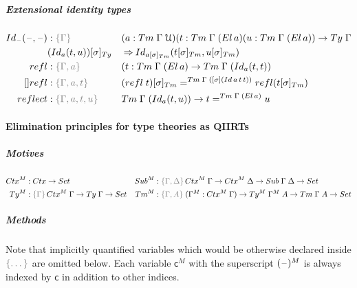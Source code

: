 \documentclass[a4paper,UKenglish,numberwithinsect,cleveref,thm-restate]{lipics-v2021}
\begin{document}
\subparagraph*{Extensional identity types}

\begin{alignat*}{5}
  \idtype[\blank]{\blank}{\blank} & : \implicit{\Gamma} && (a : \Tm\;\Gamma\;\UU) (t : \Tm\;\Gamma\;(\El\,a)(u : \Tm\;\Gamma\;(\El\,a)) \to \Ty\;\Gamma \\
  & \subTy{(\idtype[a]{t}{u})}{\sigma} && \reduce \idtype[{\subTm{a}{\sigma}}]{\subTm{t}{\sigma}}{\subTm{u}{\sigma}} \\
  \mathsf{refl} & : \implicit{\Gamma, a}\;&&(t : \Tm\;\Gamma\;(\El\,a) \to \Tm\;\Gamma\;(\idtype[a]{t}{t}) \\
  []\mathsf{refl} & : \implicit{\Gamma, a, t}\;&& \subTm{(\mathsf{refl}\;t)}{\sigma} =^{\Tm\;\Gamma\;([\sigma](\mathsf{Id}\,a\,t\,t))} \mathsf{refl}(\subTm{t}{\sigma}) \\
  \mathsf{reflect} & : \implicit{\Gamma, a, t, u}\;&& \Tm\;\Gamma\;(\idtype[a]{t}{u}) \to t =^{\Tm\;\Gamma\;(\El\,a)} u
\end{alignat*}

\paragraph*{Elimination principles for type theories as QIIRTs}

\subparagraph*{Motives}
\begin{align*}
  \Ctx^M & : \Ctx \to \Set &
  \Sub^M & : \implicit{\Gamma, \Delta}\,\Ctx^M\;\Gamma \to \Ctx^M\;\Delta \to \Sub\;\Gamma\;\Delta \to \Set \\
  \Ty^M  & : \implicit{\Gamma}\,\Ctx^M\;\Gamma \to \Ty\;\Gamma \to \Set &
  \Tm^M  & : \implicit{\Gamma, A}\; (\Gamma^M : \Ctx^M\;\Gamma) \to \Ty^M\;\Gamma^M\;A \to \Tm\;\Gamma\;A \to \Set
\end{align*}

\subparagraph*{Methods}
Note that implicitly quantified variables which would be otherwise declared inside $\implicit{\dots}$ are omitted below.
Each variable $\mathsf{c}^M$ with the superscript $(\mathord{\hspace{1pt}\text{--}\hspace{1pt}})^M$ is always indexed by $\mathsf{c}$ in addition to other indices.
\end{document}
